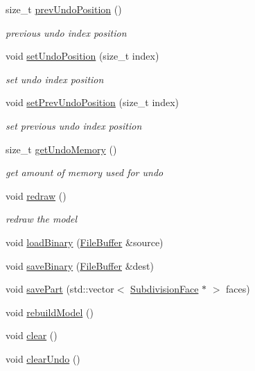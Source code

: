 \begin{DoxyCompactItemize}
size\-\_\-t \hyperlink{classShipCAD_1_1ShipCADModel_a5d2116df534ab1347961c6ab9748d1f1}{prev\-Undo\-Position} ()
\begin{DoxyCompactList}\small\item\em previous undo index position \end{DoxyCompactList}\item 
void \hyperlink{classShipCAD_1_1ShipCADModel_aa466832784532e736a1c2a16681a6d04}{set\-Undo\-Position} (size\-\_\-t index)
\begin{DoxyCompactList}\small\item\em set undo index position \end{DoxyCompactList}\item 
void \hyperlink{classShipCAD_1_1ShipCADModel_a27acd2ab4c6486a23db0b054962381bd}{set\-Prev\-Undo\-Position} (size\-\_\-t index)
\begin{DoxyCompactList}\small\item\em set previous undo index position \end{DoxyCompactList}\item 
size\-\_\-t \hyperlink{classShipCAD_1_1ShipCADModel_a0ab3edfdc89a6e297343d7c31b21658c}{get\-Undo\-Memory} ()
\begin{DoxyCompactList}\small\item\em get amount of memory used for undo \end{DoxyCompactList}\item 
void \hyperlink{classShipCAD_1_1ShipCADModel_a02282b43bfacc1cc4030bb226b814446}{redraw} ()
\begin{DoxyCompactList}\small\item\em redraw the model \end{DoxyCompactList}\item 
void \hyperlink{classShipCAD_1_1ShipCADModel_ad3e49bc04c73dc221e48d15974b68f41}{load\-Binary} (\hyperlink{classShipCAD_1_1FileBuffer}{File\-Buffer} \&source)
\item 
void \hyperlink{classShipCAD_1_1ShipCADModel_ab2b308baf2e93b80533218145472928f}{save\-Binary} (\hyperlink{classShipCAD_1_1FileBuffer}{File\-Buffer} \&dest)
\item 
void \hyperlink{classShipCAD_1_1ShipCADModel_a0d8f9cb2ce8038f6e65d90e8cab275e7}{save\-Part} (std\-::vector$<$ \hyperlink{classShipCAD_1_1SubdivisionFace}{Subdivision\-Face} $\ast$ $>$ faces)
\item 
void \hyperlink{classShipCAD_1_1ShipCADModel_a15aa59d80a4a09ec8e3c18efcb1db27f}{rebuild\-Model} ()
\item 
void \hyperlink{classShipCAD_1_1ShipCADModel_ad2f9dfd32667e9ac690de184b7e576f1}{clear} ()
\item 
void \hyperlink{classShipCAD_1_1ShipCADModel_a9d693b6b2180ce94e88224df49b909a2}{clear\-Undo} ()
\end{DoxyCompactItemize}


